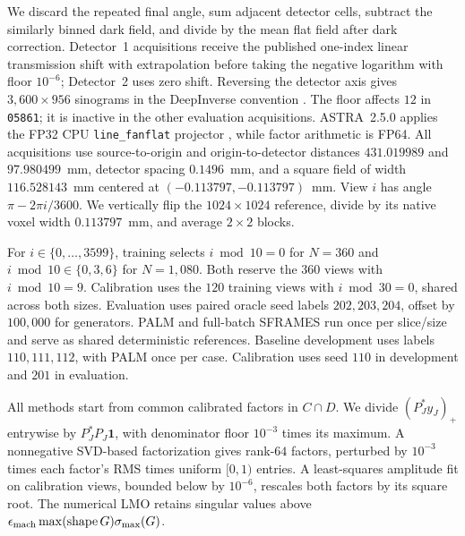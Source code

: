We discard the repeated final angle, sum adjacent detector cells, subtract
the similarly binned dark field, and divide by the mean flat field after
dark correction. Detector~1 acquisitions receive the published one-index
linear transmission shift with extrapolation before taking the negative
logarithm with floor \(10^{-6}\); Detector~2 uses zero shift. Reversing the
detector axis gives \(3{,}600\times956\) sinograms in the DeepInverse convention
\cite{deepinv}. The floor affects \(12\) in \texttt{05861}; it is inactive in the other evaluation acquisitions.
ASTRA~2.5.0 applies the FP32 CPU \texttt{line\_fanflat} projector \cite{astra},
while factor arithmetic is FP64. All acquisitions use source-to-origin and
origin-to-detector distances \(431.019989\) and \(97.980499\)~mm, detector
spacing \(0.1496\)~mm, and a square field of width \(116.528143\)~mm centered
at \((-0.113797,-0.113797)\)~mm. View \(i\) has angle \(\pi-2\pi i/3600\).
We vertically flip the \(1024\times1024\) reference, divide by its native
voxel width \(0.113797\)~mm, and average \(2\times2\) blocks.


For \(i\in\{0,\ldots,3599\}\), training selects \(i\bmod10=0\) for
\(N=360\) and \(i\bmod10\in\{0,3,6\}\) for \(N=1{,}080\).
Both reserve the \(360\) views with \(i\bmod10=9\). Calibration uses
the \(120\) training views with \(i\bmod30=0\), shared across both sizes.
Evaluation uses paired oracle seed labels \(202,203,204\), offset by
\(100{,}000\) for generators. PALM and full-batch SFRAMES run once per
slice/size and serve as shared deterministic references. Baseline development
uses labels \(110, 111, 112\), with PALM once per case. Calibration uses seed
\(110\) in development and \(201\) in evaluation.

All methods start from common calibrated factors in \(C\cap D\). We divide
\((P_J^\ast y_J)_+\) entrywise by \(P_J^\ast P_J\mathbf1\), with denominator
floor \(10^{-3}\) times its maximum. A nonnegative SVD-based factorization
gives rank-\(64\) factors, perturbed by \(10^{-3}\) times each factor's RMS
times uniform \([0,1)\) entries. A least-squares amplitude fit on calibration
views, bounded below by \(10^{-6}\), rescales both factors by its square root.
The numerical LMO retains singular values above
\(\epsilon_{\rm mach}\max(\operatorname{shape}G)\sigma_{\max}(G)\).


